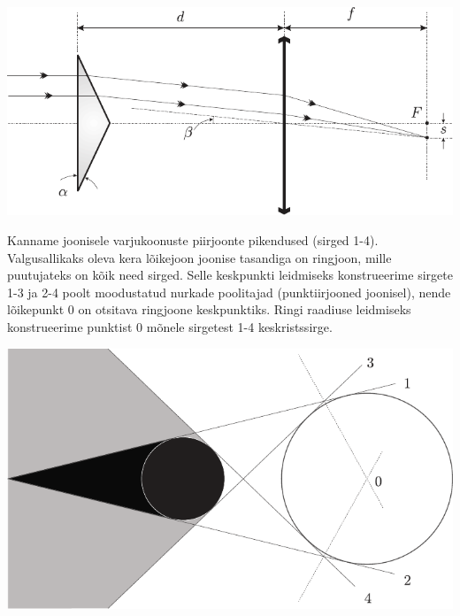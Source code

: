 \documentclass[10pt]{article}
\begin{document}
{\begin{center}
	\includegraphics[width=\linewidth]{2006-v2g-06-lah}
\end{center}
\probend
\bigskip


\solu
Kanname joonisele varjukoonuste piirjoonte pikendused (sirged 1-4). Valgusallikaks oleva kera lõikejoon joonise tasandiga on ringjoon, mille puutujateks on kõik need sirged. Selle keskpunkti leidmiseks konstrueerime sirgete 1-3 ja 2-4 poolt moodustatud nurkade poolitajad (punktiirjooned joonisel), nende lõikepunkt 0 on otsitava ringjoone keskpunktiks. Ringi raadiuse leidmiseks konstrueerime punktist 0 mõnele sirgetest 1-4 keskristssirge.

\begin{center}
	\includegraphics[width=\textwidth]{2007-v2g-06-lah}
\end{center}
\probend
\bigskip


}
\end{document}
